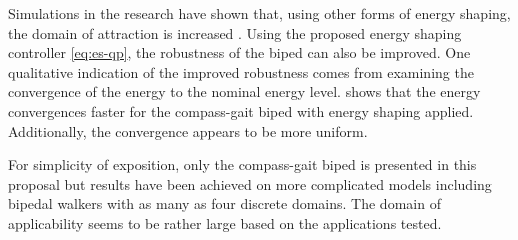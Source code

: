 Simulations in the research have shown that, using other forms of energy shaping, the domain of attraction is increased \cite{SpBh03}.
%
Using the proposed energy shaping controller \eqref{eq:es-qp}, the robustness of the biped can also be improved.
%
One qualitative indication of the improved robustness comes from examining the convergence of the energy to the nominal energy level.
%
 shows that the energy convergences faster for the compass-gait biped with energy shaping applied.
%
Additionally, the convergence appears to be more uniform.
%

For simplicity of exposition, only the compass-gait biped is presented in this proposal but results have been achieved on more complicated models including bipedal walkers with as many as four discrete domains.
%
The domain of applicability seems to be rather large based on the applications tested.
